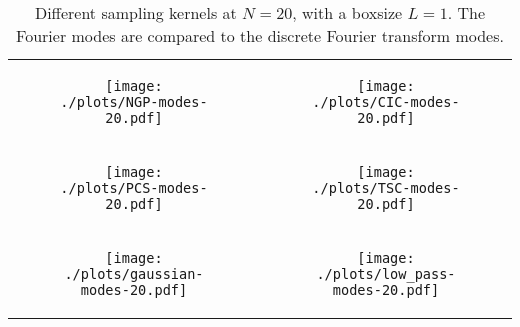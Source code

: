 {\centering%
\begin{table}
    \begin{tabular}{cc}
        \begin{subfigure}{.5\textwidth}
            \centering\texttt{[image: ./plots/NGP-modes-20.pdf]}
        \end{subfigure} &
        \begin{subfigure}{.5\textwidth}
            \centering\texttt{[image: ./plots/CIC-modes-20.pdf]}
        \end{subfigure} \\
        \begin{subfigure}{.5\textwidth}
            \centering\texttt{[image: ./plots/PCS-modes-20.pdf]}
        \end{subfigure} &
        \begin{subfigure}{.5\textwidth}
            \centering\texttt{[image: ./plots/TSC-modes-20.pdf]}
        \end{subfigure} \\
        \begin{subfigure}{.5\textwidth}
            \centering\texttt{[image: ./plots/gaussian-modes-20.pdf]}
        \end{subfigure} &
        \begin{subfigure}{.5\textwidth}
            \centering\texttt{[image: ./plots/low\_pass-modes-20.pdf]}
        \end{subfigure} \\
    \end{tabular}
    \caption{Different sampling kernels at $N=20$, with a boxsize $L=1$.
    The Fourier modes are compared to the discrete Fourier transform modes.
    }
    \label{tab:wfilters}
\end{table}
}
